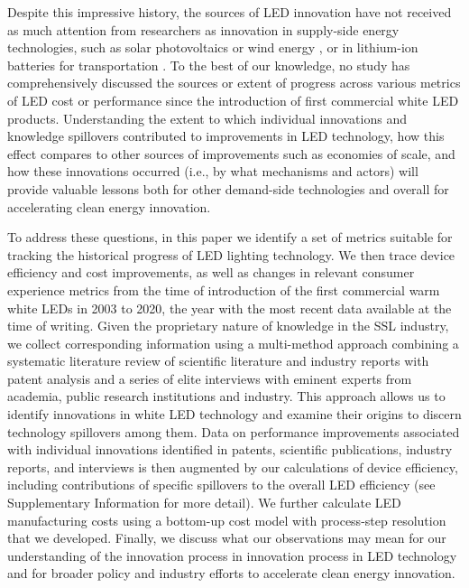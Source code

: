 \documentclass[parskip=full]{article}
\begin{document}
Despite this impressive history, the sources of LED innovation have not received as much attention from researchers as innovation in supply-side  energy technologies, such as solar photovoltaics  \cite{kavlak2018evaluating} or wind energy \cite{qiu2012price,jennings2020policy}, or in lithium-ion batteries for transportation \cite{Ziegler2021,Stephan2021}. To the best of our knowledge, no study has comprehensively discussed the sources or extent of progress across various metrics of LED cost or performance since the introduction of first commercial white LED products.  Understanding the extent to which individual innovations and knowledge spillovers  contributed to improvements in LED technology, how this effect compares to other sources of improvements such as economies of scale, and how these innovations occurred (i.e., by what mechanisms and actors) will provide valuable lessons both for other demand-side technologies and overall for accelerating clean energy innovation.

To address these questions, in this paper we identify a set of metrics suitable for tracking the historical progress of LED lighting technology. We then trace device efficiency and cost improvements, as well as changes in relevant consumer experience metrics from the time of introduction of the first commercial warm white LEDs in 2003 to 2020, the year with the most recent data available at the time of writing. Given the proprietary nature of knowledge in the SSL industry, we collect corresponding information using a multi-method approach combining a systematic literature review of scientific literature and industry reports with patent analysis and a series of elite interviews with eminent experts from academia, public research institutions and industry. This approach allows us to identify innovations in white LED technology and examine their origins to discern technology spillovers among them. Data on performance improvements associated with individual innovations identified in patents, scientific publications, industry reports, and interviews is then augmented  by our calculations of device efficiency, including contributions of specific spillovers to the overall LED efficiency (see Supplementary Information for more detail). We further calculate LED manufacturing costs using a bottom-up cost model with process-step resolution that we developed. Finally, we discuss what our observations may mean for our understanding of the innovation process in innovation process in LED technology and for broader policy and industry efforts to accelerate clean energy innovation.
\end{document}
